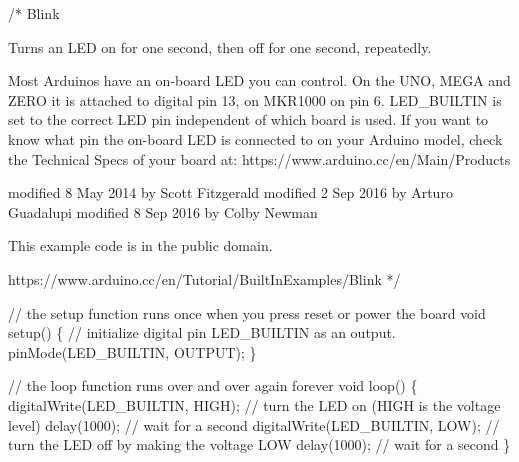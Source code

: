 \documentclass[
  letterpaper,
  DIV=11,
  numbers=noendperiod]{scrreprt}
\newenvironment{Shaded}{\begin{snugshade}}{\end{snugshade}}
\newcommand{\CommentTok}[1]{\textcolor[rgb]{0.37,0.37,0.37}{#1}}
\newcommand{\DataTypeTok}[1]{\textcolor[rgb]{0.68,0.00,0.00}{#1}}
\newcommand{\DecValTok}[1]{\textcolor[rgb]{0.68,0.00,0.00}{#1}}
\newcommand{\NormalTok}[1]{\textcolor[rgb]{0.00,0.23,0.31}{#1}}
\newcommand{\OperatorTok}[1]{\textcolor[rgb]{0.37,0.37,0.37}{#1}}
\begin{document}
\begin{Shaded}
\begin{Highlighting}[]
\CommentTok{/*}
\CommentTok{  Blink}

\CommentTok{  Turns an LED on for one second, then off for one second, repeatedly.}

\CommentTok{  Most Arduinos have an on{-}board LED you can control. On the UNO, MEGA and ZERO}
\CommentTok{  it is attached to digital pin 13, on MKR1000 on pin 6. LED\_BUILTIN is set to}
\CommentTok{  the correct LED pin independent of which board is used.}
\CommentTok{  If you want to know what pin the on{-}board LED is connected to on your Arduino}
\CommentTok{  model, check the Technical Specs of your board at:}
\CommentTok{  https://www.arduino.cc/en/Main/Products}

\CommentTok{  modified 8 May 2014}
\CommentTok{  by Scott Fitzgerald}
\CommentTok{  modified 2 Sep 2016}
\CommentTok{  by Arturo Guadalupi}
\CommentTok{  modified 8 Sep 2016}
\CommentTok{  by Colby Newman}

\CommentTok{  This example code is in the public domain.}

\CommentTok{  https://www.arduino.cc/en/Tutorial/BuiltInExamples/Blink}
\CommentTok{*/}

\CommentTok{// the setup function runs once when you press reset or power the board}
\DataTypeTok{void}\NormalTok{ setup}\OperatorTok{()} \OperatorTok{\{}
  \CommentTok{// initialize digital pin LED\_BUILTIN as an output.}
\NormalTok{  pinMode}\OperatorTok{(}\NormalTok{LED\_BUILTIN}\OperatorTok{,}\NormalTok{ OUTPUT}\OperatorTok{);}
\OperatorTok{\}}

\CommentTok{// the loop function runs over and over again forever}
\DataTypeTok{void}\NormalTok{ loop}\OperatorTok{()} \OperatorTok{\{}
\NormalTok{  digitalWrite}\OperatorTok{(}\NormalTok{LED\_BUILTIN}\OperatorTok{,}\NormalTok{ HIGH}\OperatorTok{);}  \CommentTok{// turn the LED on (HIGH is the voltage level)}
\NormalTok{  delay}\OperatorTok{(}\DecValTok{1000}\OperatorTok{);}                      \CommentTok{// wait for a second}
\NormalTok{  digitalWrite}\OperatorTok{(}\NormalTok{LED\_BUILTIN}\OperatorTok{,}\NormalTok{ LOW}\OperatorTok{);}   \CommentTok{// turn the LED off by making the voltage LOW}
\NormalTok{  delay}\OperatorTok{(}\DecValTok{1000}\OperatorTok{);}                      \CommentTok{// wait for a second}
\OperatorTok{\}}
\end{Highlighting}
\end{Shaded}
\end{document}
